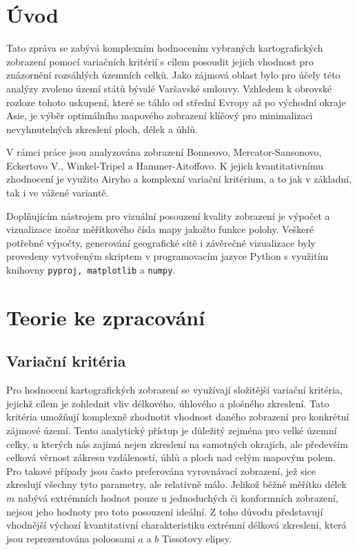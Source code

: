 \section*{Úvod}
Tato zpráva se zabývá komplexním hodnocením vybraných kartografických zobrazení pomocí variačních kritérií s cílem posoudit jejich vhodnost pro znázornění rozsáhlých územních celků.
Jako zájmová oblast bylo pro účely této analýzy zvoleno území států bývalé Varšavské smlouvy.
Vzhledem k obrovské rozloze tohoto uskupení, které se táhlo od střední Evropy až po východní okraje Asie, je výběr optimálního mapového zobrazení klíčový pro minimalizaci nevyhnutelných zkreslení ploch, délek a úhlů. 

V rámci práce jsou analyzována zobrazení Bonneovo, Mercator-Sansonovo, Eckertovo V., Winkel-Tripel a Hammer-Aitoffovo.
K jejich kvantitativnímu zhodnocení je využito Airyho a komplexní variační kritérium, a to jak v základní, tak i ve vážené variantě.

Doplňujícím nástrojem pro vizuální posouzení kvality zobrazení je výpočet a vizualizace izočar měřítkového čísla mapy jakožto funkce polohy.
Veškeré potřebné výpočty, generování geografické sítě i závěrečné vizualizace byly provedeny vytvořeným skriptem v programovacím jazyce Python s využitím knihovny \lstinline|pyproj, matplotlib| a \lstinline|numpy|.

\newpage
\section*{Teorie ke zpracování}  
\subsection*{Variační kritéria } 

Pro hodnocení kartografických zobrazení se využívají složitější variační kritéria, jejichž cílem je zohlednit vliv délkového, úhlového a plošného zkreslení.
Tato kritéria umožňují komplexně zhodnotit vhodnost daného zobrazení pro konkrétní zájmové území.
Tento analytický přístup je důležitý zejména pro velké územní celky, u kterých nás zajímá nejen zkreslení na samotných okrajích, ale především celková věrnost zákresu vzdáleností, úhlů a ploch nad celým mapovým polem.
Pro takové případy jsou často preferována vyrovnávací zobrazení, jež sice zkreslují všechny tyto parametry, ale relativně málo. 
Jelikož běžné měřítko délek $m$ nabývá extrémních hodnot pouze u jednoduchých či konformních zobrazení, nejsou jeho hodnoty pro toto posouzení ideální.
Z toho důvodu představují vhodnější výchozí kvantitativní charakteristiku extrémní délková zkreslení, která jsou reprezentována poloosami $a$ a $b$ Tissotovy elipsy.

